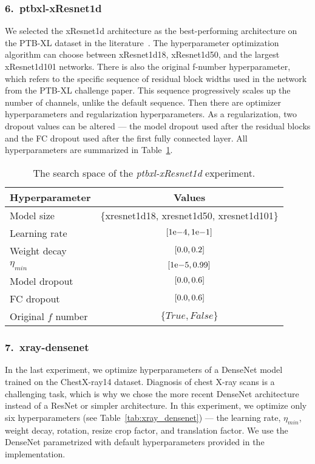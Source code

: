 \subsubsection{6.\ ptbxl-xResnet1d}
We selected the xResnet1d architecture as the best-performing architecture on the PTB-XL dataset in the literature~\cite{strodthoff2020deep}. The hyperparameter optimization algorithm can choose between xResnet1d18, xResnet1d50, and the largest xResnet1d101 networks. There is also the original f-number hyperparameter, which refers to the specific sequence of residual block widths used in the network from the PTB-XL challenge paper. This sequence progressively scales up the number of channels, unlike the default sequence. Then there are optimizer hyperparameters and regularization hyperparameters. As a regularization, two dropout values can be altered --- the model dropout used after the residual blocks and the FC dropout used after the first fully connected layer. All hyperparameters are summarized in Table~\ref{tab:ptbxl_xresnet}.

\begin{table}
    \centering
    \begin{tabular}{lc}
        \toprule
        Hyperparameter & Values \\
        \midrule
        Model size & \{xresnet1d18, xresnet1d50, xresnet1d101\} \\
        Learning rate & $\interval{1\mathrm{e}{-4}}{1\mathrm{e}{-1}}$ \\
        Weight decay & $\interval{0.0}{0.2}$ \\
        $\eta_{min}$ & $\interval{1\mathrm{e}{-5}}{0.99}$ \\
        Model dropout & $\interval{0.0}{0.6}$ \\
        FC dropout & $\interval{0.0}{0.6}$ \\
        Original $f$ number & $\{True, False\}$ \\
        \bottomrule
    \end{tabular}
    \caption{The search space of the \textit{ptbxl-xResnet1d} experiment.}
    \label{tab:ptbxl_xresnet}
\end{table}

\subsubsection{7.\ xray-densenet}
In the last experiment, we optimize hyperparameters of a DenseNet model trained on the ChestX-ray14 dataset. Diagnosis of chest X-ray scans is a challenging task, which is why we chose the more recent DenseNet architecture instead of a ResNet or simpler architecture. In this experiment, we optimize only six hyperparameters (see Table~\ref{tab:xray_densenet}) --- the learning rate, $\eta_{min}$, weight decay, rotation, resize crop factor, and translation factor. We use the DenseNet parametrized with default hyperparameters provided in the implementation.

